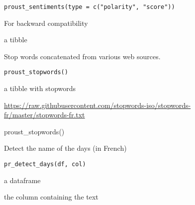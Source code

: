 \documentclass[a4paper]{book}
\begin{document}
%
\begin{Usage}
\begin{verbatim}
proust_sentiments(type = c("polarity", "score"))
\end{verbatim}
\end{Usage}
%
\begin{Arguments}
\begin{ldescription}
\item[\code{type}] For backward compatibility
\end{ldescription}
\end{Arguments}
%
\begin{Value}
a tibble
\end{Value}
%
\begin{Description}\relax
Stop words concatenated from various web sources.
\end{Description}
%
\begin{Usage}
\begin{verbatim}
proust_stopwords()
\end{verbatim}
\end{Usage}
%
\begin{Value}
a tibble with stopwords
\end{Value}
%
\begin{Source}\relax
\url{https://raw.githubusercontent.com/stopwords-iso/stopwords-fr/master/stopwords-fr.txt}
\end{Source}
%
\begin{Examples}
\begin{ExampleCode}
proust_stopwords()
\end{ExampleCode}
\end{Examples}
%
\begin{Description}\relax
Detect the name of the days (in French)
\end{Description}
%
\begin{Usage}
\begin{verbatim}
pr_detect_days(df, col)
\end{verbatim}
\end{Usage}
%
\begin{Arguments}
\begin{ldescription}
\item[\code{df}] a dataframe

\item[\code{col}] the column containing the text
\end{ldescription}
\end{Arguments}
\end{document}

